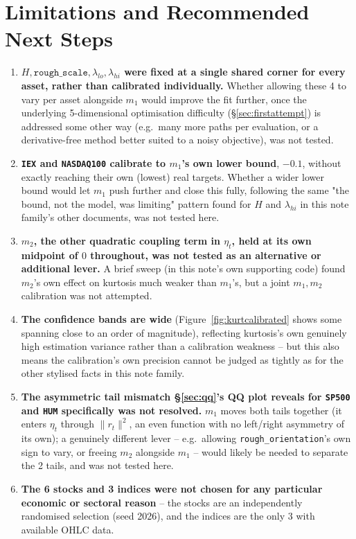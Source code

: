 \documentclass[11pt]{article}
\begin{document}
\section{Limitations and Recommended Next Steps}
\begin{enumerate}
\item \textbf{$H,\texttt{rough\_scale},\lambda_{lo},\lambda_{hi}$ were fixed
at a single shared corner for every asset, rather than calibrated
individually.} Whether allowing these 4 to vary per asset alongside $m_1$
would improve the fit further, once the underlying 5-dimensional
optimisation difficulty (\S\ref{sec:firstattempt}) is addressed some other
way (e.g.\ many more paths per evaluation, or a derivative-free method
better suited to a noisy objective), was not tested.
\item \textbf{\texttt{IEX} and \texttt{NASDAQ100} calibrate to $m_1$'s own
lower bound}, $-0.1$, without exactly reaching their own (lowest) real
targets. Whether a wider lower bound would let $m_1$ push further and close
this fully, following the same "the bound, not the model, was limiting"
pattern found for $H$ and $\lambda_{hi}$ in this note family's other
documents, was not tested here.
\item \textbf{$m_2$, the other quadratic coupling term in $\eta_t$, held at
its own midpoint of $0$ throughout, was not tested as an alternative or
additional lever.} A brief sweep (in this note's own supporting code) found
$m_2$'s own effect on kurtosis much weaker than $m_1$'s, but a joint
$m_1,m_2$ calibration was not attempted.
\item \textbf{The confidence bands are wide} (Figure~\ref{fig:kurtcalibrated}
shows some spanning close to an order of magnitude), reflecting kurtosis's
own genuinely high estimation variance rather than a calibration weakness --
but this also means the calibration's own precision cannot be judged as
tightly as for the other stylised facts in this note family.
\item \textbf{The asymmetric tail mismatch \S\ref{sec:qq}'s QQ plot reveals
for \texttt{SP500} and \texttt{HUM} specifically was not resolved.} $m_1$
moves both tails together (it enters $\eta_t$ through $\lVert r_t\rVert^2$,
an even function with no left/right asymmetry of its own); a genuinely
different lever -- e.g.\ allowing \texttt{rough\_orientation}'s own sign to
vary, or freeing $m_2$ alongside $m_1$ -- would likely be needed to separate
the 2 tails, and was not tested here.
\item \textbf{The 6 stocks and 3 indices were not chosen for any particular
economic or sectoral reason} -- the stocks are an independently randomised
selection (seed 2026), and the indices are the only 3 with available OHLC
data.
\end{enumerate}
\end{document}
